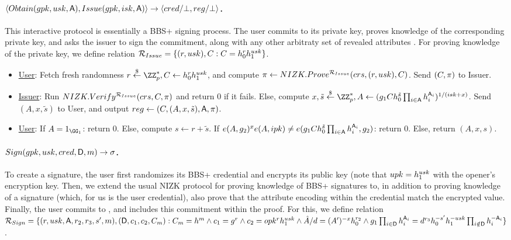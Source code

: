 \paragraph{$\langle Obtain(gpk,usk,\mathsf{A}),Issue(gpk,isk,\mathsf{A}) \rangle
  \rightarrow \langle cred/\bot,reg/\bot \rangle$.} %
This interactive protocol is essentially a BBS+ signing  process. The user
commits to its private key, proves knowledge of the corresponding private
key, and asks the issuer to sign the commitment, along with any other arbitraty
set of revealed attributes \Attrs. For proving knowledge of the private key, we
define relation $\mathcal{R}_{Issue} = \lbrace (r, usk), C: C =
h_0^rh_1^{usk}\rbrace$.

\begin{itemize}
\item \underline{User}: Fetch fresh randomness $r \getr \ZZ^*_p,
  \Ccom \gets \gen{h}_0^r\gen{h}_1^{\usk}$, and compute $\pi \gets
  NIZK.Prove^{\mathcal{R}_{Issue}}(crs,(r,usk),
  C)$. Send $(C,\pi)$ to Issuer.
\item \underline{Issuer}: Run $NIZK.Verify^{\mathcal{R}_{Issue}}(crs,C,
  \pi)$ and return $0$ if it fails. Else, compute
  $x,\tilde{s} \getr \ZZ^*_p, A \gets
  (\gen{g}_1\Ccom h_0^{\tilde{s}} \prod_{i \in \Attrs}
  \gen{h}_i^{\Attrs_i})^{1/(\isk+x)}$.
  Send $(A,x,\tilde{s})$ to User, and output $reg \gets
  (C,(A,x,\tilde{s}),\mathsf{A},\pi)$.
\item \underline{User}: If $A = 1_{\GG_1}$: return $0$. Else, compute
  $s \gets r + \tilde{s}$. If $e(A,g_2)^xe(A,ipk) \neq
  e(g_1Ch_0^{\tilde{s}}\prod_{i \in \mathsf{A}}h_i^{\mathsf{A}_i},
  g_2)$: return $0$. Else, return
  $(A,x,s)$.
\end{itemize}

\paragraph{$Sign(gpk,usk,cred,\mathsf{D},m) \rightarrow \sigma$.} %
To create a signature, the user first randomizes its BBS+ credential \cred and
encrypts its public key \upk (note that $upk=h_1^{usk}$ with the
opener's encryption key. Then, we extend the usual NIZK protocol for proving
knowledge of BBS+ signatures \cite{cdl16b} to, in addition to proving knowledge
of a signature (which, for us is the user credential), also prove that the
attribute encoding \usk within the credential match the encrypted value.
Finally, the user commits to \msg, and includes this commitment within the
proof. For this, we define relation
$\mathcal{R}_{Sign}= \lbrace (r,usk,\mathsf{A},r_2,r_3,s',m),(\mathsf{D},c_1,c_2,
C_{m}): C_{m} = h^m \land c_1 = g^r \land c_2 = opk^rh_1^{usk}
\land \hat{A}/d = (A')^{-x}h_0^{r_2} \land
g_1 \prod_{i \in \mathsf{D}} h_i^{\mathsf{A}_i} =
d^{r_3}h_0^{-s'}h_1^{-usk}
\prod_{i \notin \mathsf{D}} h_i^{-\mathsf{A}_i} \rbrace$.

